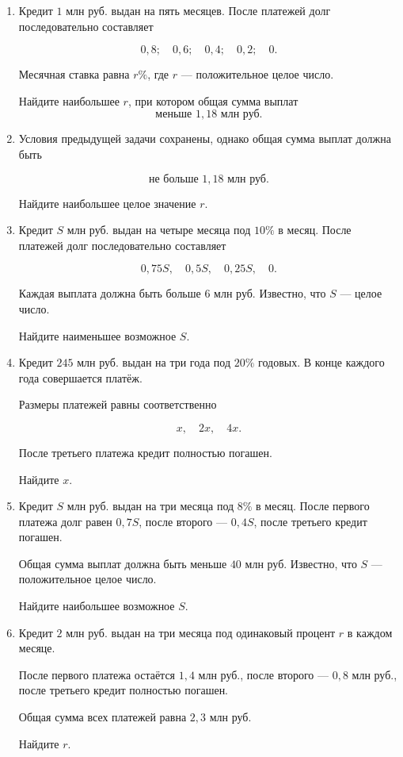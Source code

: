 \documentclass[a4paper,12pt]{article}
\begin{document}
\begin{enumerate}[leftmargin=2em,itemsep=1.15em,start=4]

\item
Кредит \(1\) млн руб. выдан на пять месяцев.
После платежей долг последовательно составляет

\[
0{,}8;\quad0{,}6;\quad0{,}4;\quad0{,}2;\quad0.
\]

Месячная ставка равна \(r\%\), где \(r\) --- положительное целое число.

Найдите наибольшее \(r\), при котором общая сумма выплат
\[
\textbf{меньше }1{,}18\text{ млн руб.}
\]

\item
Условия предыдущей задачи сохранены, однако общая сумма выплат должна быть

\[
\textbf{не больше }1{,}18\text{ млн руб.}
\]

Найдите наибольшее целое значение \(r\).

\item
Кредит \(S\) млн руб. выдан на четыре месяца под \(10\%\) в месяц.
После платежей долг последовательно составляет

\[
0{,}75S,\quad0{,}5S,\quad0{,}25S,\quad0.
\]

Каждая выплата должна быть больше \(6\) млн руб.
Известно, что \(S\) --- целое число.

Найдите наименьшее возможное \(S\).

\item
Кредит \(245\) млн руб. выдан на три года под \(20\%\) годовых.
В конце каждого года совершается платёж.

Размеры платежей равны соответственно

\[
x,\quad2x,\quad4x.
\]

После третьего платежа кредит полностью погашен.

Найдите \(x\).

\item
Кредит \(S\) млн руб. выдан на три месяца под \(8\%\) в месяц.
После первого платежа долг равен \(0{,}7S\), после второго ---
\(0{,}4S\), после третьего кредит погашен.

Общая сумма выплат должна быть меньше \(40\) млн руб.
Известно, что \(S\) --- положительное целое число.

Найдите наибольшее возможное \(S\).

\item
Кредит \(2\) млн руб. выдан на три месяца под одинаковый процент \(r\)
в каждом месяце.

После первого платежа остаётся \(1{,}4\) млн руб.,
после второго --- \(0{,}8\) млн руб.,
после третьего кредит полностью погашен.

Общая сумма всех платежей равна \(2{,}3\) млн руб.

Найдите \(r\).

\end{enumerate}
\end{document}
